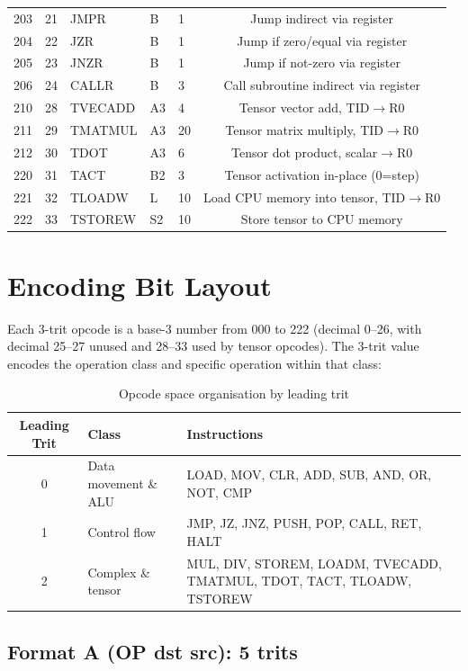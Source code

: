 \documentclass[12pt,a4paper,twoside]{book}
\theoremstyle{trinarytheorem}
\theoremstyle{trinarydefinition}
\begin{document}
\begin{longtable}{cllllc}
203 & 21 & JMPR    & B  & 1 & Jump indirect via register \\
204 & 22 & JZR     & B  & 1 & Jump if zero/equal via register \\
205 & 23 & JNZR    & B  & 1 & Jump if not-zero via register \\
206 & 24 & CALLR   & B  & 3 & Call subroutine indirect via register \\
210 & 28 & TVECADD & A3 & 4 & Tensor vector add, TID$\rightarrow$R0 \\
211 & 29 & TMATMUL & A3 & 20 & Tensor matrix multiply, TID$\rightarrow$R0 \\
212 & 30 & TDOT    & A3 & 6 & Tensor dot product, scalar$\rightarrow$R0 \\
220 & 31 & TACT    & B2 & 3 & Tensor activation in-place (0=step) \\
221 & 32 & TLOADW  & L  & 10 & Load CPU memory into tensor, TID$\rightarrow$R0 \\
222 & 33 & TSTOREW & S2 & 10 & Store tensor to CPU memory \\
\end{longtable}

\section{Encoding Bit Layout}

Each 3-trit opcode is a base-3 number from 000 to 222 (decimal 0--26, with
decimal 25--27 unused and 28--33 used by tensor opcodes). The 3-trit value encodes the operation class
and specific operation within that class:

\begin{table}[H]
\centering
\caption{Opcode space organisation by leading trit}
\label{tab:opclass}
\begin{tabular}{cll}
\toprule
Leading Trit & Class & Instructions \\
\midrule
0 & Data movement \& ALU & LOAD, MOV, CLR, ADD, SUB, AND, OR, NOT, CMP \\
1 & Control flow & JMP, JZ, JNZ, PUSH, POP, CALL, RET, HALT \\
2 & Complex \& tensor & MUL, DIV, STOREM, LOADM, TVECADD, TMATMUL, TDOT, TACT, TLOADW, TSTOREW \\
\bottomrule
\end{tabular}
\end{table}

\subsection{Format A (OP dst src): 5 trits}
\end{document}
